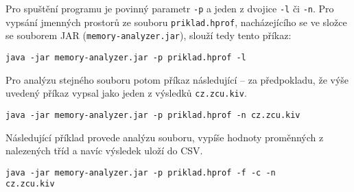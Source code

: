 Pro spuštění programu je povinný parametr \texttt{-p} a jeden z dvojice \texttt{-l} či \texttt{-n}. Pro vypsání jmenných prostorů ze souboru \texttt{priklad.hprof}, nacházejícího se ve složce se souborem JAR (\texttt{memory-analyzer.jar}), slouží tedy tento příkaz:

\begin{lstlisting}[frame={single}]
java -jar memory-analyzer.jar -p priklad.hprof -l
\end{lstlisting}

Pro analýzu stejného souboru potom příkaz následující -- za předpokladu, že výše uvedený příkaz vypsal jako jeden z výsledků \texttt{cz.zcu.kiv}.

\begin{lstlisting}[frame={single}]
java -jar memory-analyzer.jar -p priklad.hprof -n cz.zcu.kiv
\end{lstlisting}

Následující příklad provede analýzu souboru, vypíše hodnoty proměnných z nalezených tříd a navíc výsledek uloží do CSV.

\begin{lstlisting}[frame={single}]
java -jar memory-analyzer.jar -p priklad.hprof -f -c -n 
cz.zcu.kiv
\end{lstlisting}